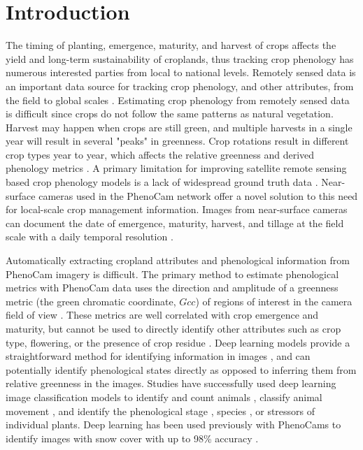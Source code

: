 \documentclass[remotesensing,article,submit,moreauthors,pdftex]{Definitions/mdpi}
\begin{document}

\section{Introduction}
The timing of planting, emergence, maturity, and harvest of crops affects the yield and long-term sustainability of croplands, thus tracking crop phenology has numerous interested parties from local to national levels. Remotely sensed data is an important data source for tracking crop phenology, and other attributes, from the field to global scales \citep{weiss2020}. Estimating crop phenology from remotely sensed data is difficult since crops do not follow the same patterns as natural vegetation. Harvest may happen when crops are still green, and multiple harvests in a single year will result in several "peaks" in greenness. Crop rotations result in different crop types year to year, which affects the relative greenness and derived phenology metrics \citep{gao2017}. A primary limitation for improving satellite remote sensing based crop phenology models is a lack of widespread ground truth data \citep{gao-zhang2021}. Near-surface cameras used in the PhenoCam network offer a novel solution to this need for local-scale crop management information. Images from near-surface cameras can document the date of emergence, maturity, harvest, and tillage at the field scale with a daily temporal resolution \citep{hufkens2019}.

Automatically extracting cropland attributes and phenological information from PhenoCam imagery is difficult. The primary method to estimate phenological metrics with PhenoCam data uses the direction and amplitude of a greenness metric (the green chromatic coordinate, $Gcc$) of regions of interest in the camera field of view \citep{richardson2018a, seyednasrollah2019b-scidata}. These metrics are well correlated with crop emergence and maturity, but cannot be used to directly identify other attributes such as crop type, flowering, or the presence of crop residue \citep{browning2021}. Deep learning models provide a straightforward method for identifying information in images \citep{borowiec2021}, and can potentially identify phenological states directly as opposed to inferring them from relative greenness in the  images. Studies have successfully used deep learning image classification models to identify and count animals \citep{weinstein2018, norouzzadeh2018}, classify animal movement \citep{conway2021}, and identify the phenological stage \citep{correia2020}, species \citep{jones2020}, or stressors \citep{ghosal2018} of individual plants. Deep learning has been used previously  with PhenoCams to identify images with snow cover with up to 98\% accuracy \citep{kosmala2016}.
\end{document}
